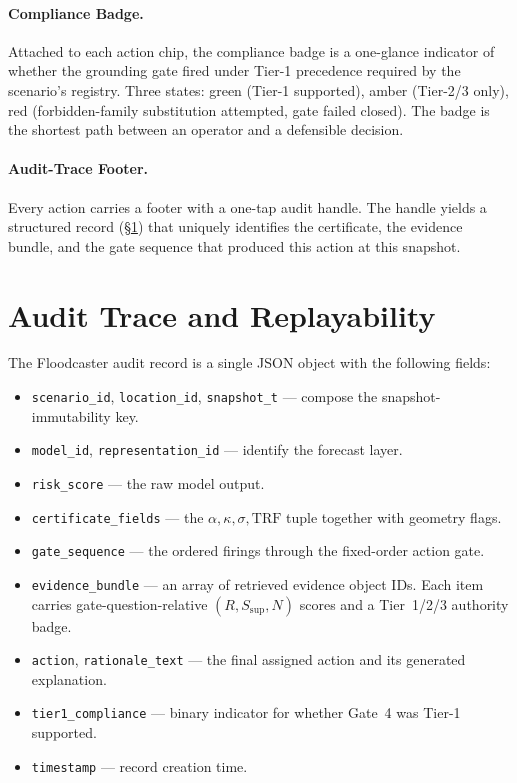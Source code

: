 \documentclass[sigconf,nonacm=true,review,authoryear]{acmart}
\begin{document}
\paragraph{Compliance Badge.}
Attached to each action chip, the compliance badge is a one-glance
indicator of whether the grounding gate fired under Tier-1 precedence
required by the scenario's registry. Three states: green (Tier-1
supported), amber (Tier-2/3 only), red (forbidden-family
substitution attempted, gate failed closed). The badge is the
shortest path between an operator and a defensible decision.

\paragraph{Audit-Trace Footer.}
Every action carries a footer with a one-tap audit handle. The handle
yields a structured record (\S\ref{sec:demo-audit}) that uniquely
identifies the certificate, the evidence bundle, and the gate
sequence that produced this action at this snapshot.

\section{Audit Trace and Replayability}
\label{sec:demo-audit}

The Floodcaster audit record is a single JSON object with the
following fields:

\begin{itemize}
\setlength{\itemsep}{1pt}
\item \texttt{scenario\_id}, \texttt{location\_id}, \texttt{snapshot\_t}
  --- compose the snapshot-immutability key.
\item \texttt{model\_id}, \texttt{representation\_id} --- identify
  the forecast layer.
\item \texttt{risk\_score} --- the raw model output.
\item \texttt{certificate\_fields} --- the
  $\alpha, \kappa, \sigma, \mathrm{TRF}$ tuple together with
  geometry flags.
\item \texttt{gate\_sequence} --- the ordered firings through the
  fixed-order action gate.
\item \texttt{evidence\_bundle} --- an array of retrieved evidence
  object IDs. Each item carries gate-question-relative
  $(R, S_{\text{sup}}, N)$ scores and a Tier~1/2/3 authority badge.
\item \texttt{action}, \texttt{rationale\_text} --- the final
  assigned action and its generated explanation.
\item \texttt{tier1\_compliance} --- binary indicator for whether
  Gate~4 was Tier-1 supported.
\item \texttt{timestamp} --- record creation time.
\end{itemize}
\end{document}
